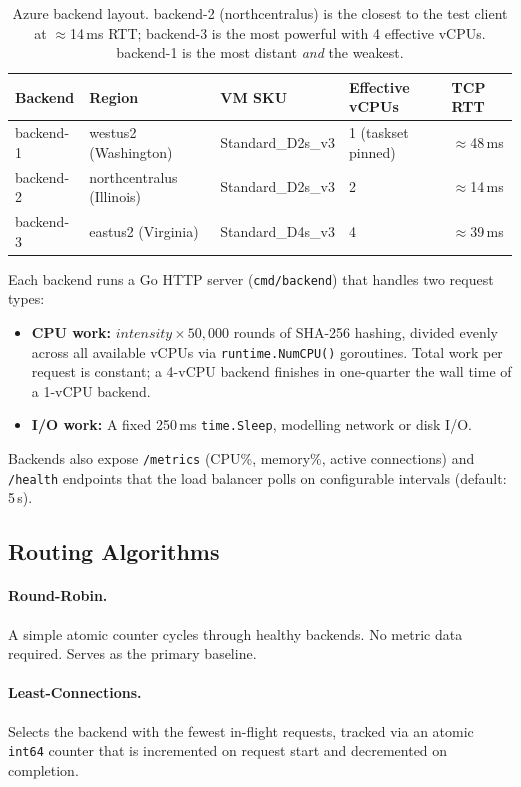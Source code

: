 \documentclass[12pt]{article}
\begin{document}
\begin{table}[H]
\centering
\begin{tabular}{lllll}
\toprule
Backend & Region & VM SKU & Effective vCPUs & TCP RTT \\
\midrule
backend-1 & westus2 (Washington)    & Standard\_D2s\_v3 & 1 (taskset pinned) & $\approx$48\,ms \\
backend-2 & northcentralus (Illinois) & Standard\_D2s\_v3 & 2               & $\approx$14\,ms \\
backend-3 & eastus2 (Virginia)      & Standard\_D4s\_v3 & 4                  & $\approx$39\,ms \\
\bottomrule
\end{tabular}
\caption{Azure backend layout. backend-2 (northcentralus) is the closest to
the test client at $\approx$14\,ms RTT; backend-3 is the most powerful with
4 effective vCPUs. backend-1 is the most distant \emph{and} the weakest.}
\end{table}

Each backend runs a Go HTTP server (\texttt{cmd/backend}) that handles two
request types:
\begin{itemize}
  \item \textbf{CPU work:} $\textit{intensity} \times 50{,}000$ rounds of
        SHA-256 hashing, divided evenly across all available vCPUs via
        \texttt{runtime.NumCPU()} goroutines. Total work per request is
        constant; a 4-vCPU backend finishes in one-quarter the wall time of
        a 1-vCPU backend.
  \item \textbf{I/O work:} A fixed 250\,ms \texttt{time.Sleep}, modelling
        network or disk I/O.
\end{itemize}

Backends also expose \texttt{/metrics} (CPU\%, memory\%, active connections)
and \texttt{/health} endpoints that the load balancer polls on configurable
intervals (default: 5\,s).

\subsection{Routing Algorithms}

\paragraph{Round-Robin.}
A simple atomic counter cycles through healthy backends. No metric data
required. Serves as the primary baseline.

\paragraph{Least-Connections.}
Selects the backend with the fewest in-flight requests, tracked via an atomic
\texttt{int64} counter that is incremented on request start and decremented on
completion.
\end{document}
